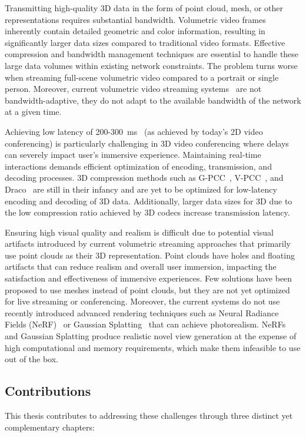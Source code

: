 %
Transmitting high-quality 3D data in the form of point cloud, mesh, or other representations requires substantial bandwidth. 
%
Volumetric video frames inherently contain detailed geometric and color information, resulting in significantly larger data sizes compared to traditional video formats. 
%
Effective compression and bandwidth management techniques are essential to handle these large data volumes within existing network constraints. 
%
The problem turns worse when streaming full-scene volumetric video compared to a portrait or single person. 
%
Moreover, current volumetric video streaming systems~\cite{vivo, groot,holoportation,livescan3d} are not bandwidth-adaptive, \ie they do not adapt to the available bandwidth of the network at a given time. 

%
Achieving low latency of 200-300~ms~\cite{videoconf-benchmark, conf-abr1,conf-abr2} (as achieved by today's 2D video conferencing) is particularly challenging in 3D video conferencing where delays can severely impact user's immersive experience.
%
Maintaining real-time interactions demands efficient optimization of encoding, transmission, and decoding processes. 
%
3D compression methods such as G-PCC~\cite{gpcc}, V-PCC~\cite{vpcc}, and Draco~\cite{draco} are still in their infancy and are yet to be optimized for low-latency encoding and decoding of 3D data.
%
Additionally, larger data sizes for 3D due to the low compression ratio achieved by 3D codecs increase transmission latency.

%
Ensuring high visual quality and realism is difficult due to potential visual artifacts introduced by current volumetric streaming approaches that primarily use point clouds as their 3D representation. 
%
Point clouds have holes and floating artifacts that can reduce realism and overall user immersion, impacting the satisfaction and effectiveness of immersive experiences. 
%
Few solutions have been proposed to use meshes instead of point clouds, but they are not yet optimized for live streaming or conferencing. 
%
Moreover, the current systems do not use recently introduced advanced rendering techniques such as Neural Radiance Fields (NeRF)~\cite{nerf} or Gaussian Splatting~\cite{gsplat} that can achieve photorealism.
%
NeRFs and Gaussian Splatting produce realistic novel view generation at the expense of high computational and memory requirements, which make them infeasible to use out of the box.

\subsection{Contributions}
%
This thesis contributes to addressing these challenges through three distinct yet complementary chapters:

